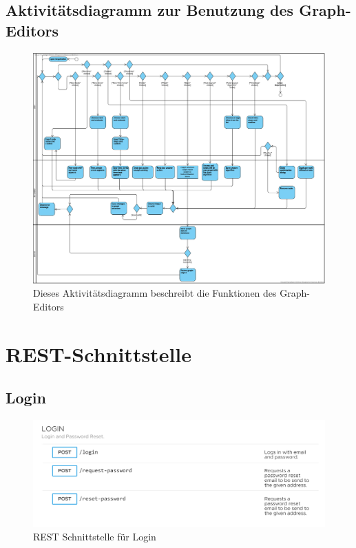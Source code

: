 \documentclass{article}
\begin{document}
\subsection{Aktivitätsdiagramm zur Benutzung des Graph-Editors}
\begin{figure}[ht!]
    \includegraphics[width=\textwidth,height=\textheight,keepaspectratio]{image/Activity_Grapheditor.png}
    \caption{Dieses Aktivitätsdiagramm beschreibt die Funktionen des Graph-Editors }
\end{figure}
\newpage

\section{REST-Schnittstelle}

\subsection{Login}
\begin{figure}[ht!]
    \includegraphics[width=\linewidth]{image/REST_Login.png}
    \caption{REST Schnittstelle für Login}
\end{figure}
\end{document}
